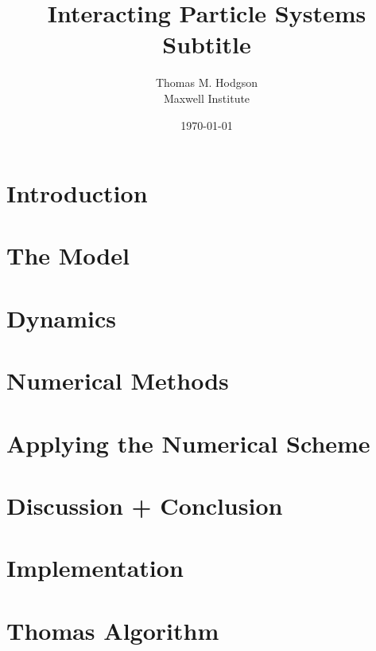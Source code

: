 \documentclass[11pt, a4paper]{article}
\title{{\huge Interacting Particle Systems} \\ \vspace{1cm} Subtitle}
\author{Thomas M. Hodgson\\ \vspace{0.5cm} Maxwell Institute}
\date{\today}
\begin{document}
	\maketitle
    \thispagestyle{empty}
	\newpage
	\tableofcontents
	\listoffigures
	\newpage   
	\section{Introduction}\label{sec:introduction}
        
       
	\section{The Model}\label{sec:model}
        
        
	\section{Dynamics}\label{sec:dynamics}
        
        
   	\section{Numerical Methods}\label{sec:numericalmethods}
        
 
    \section{Applying the Numerical Scheme}\label{sec:application}
        
        
    \section{Discussion + Conclusion}\label{sec:conclusion}
        

    
    
    \appendix
    \section{Implementation}\label{app:code}
    
    \section{Thomas Algorithm}\label{app:thomas}
    
\end{document}

